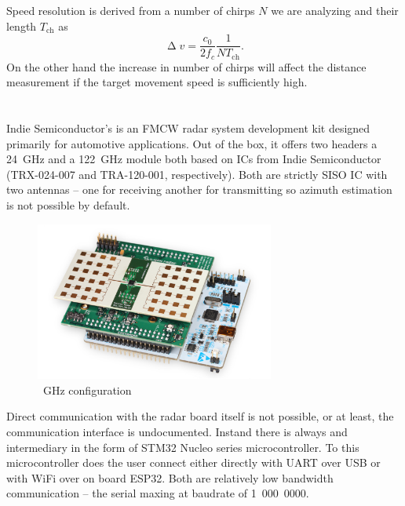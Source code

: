 Speed resolution is derived from a number of chirps $N$ we are analyzing and their length $T_{\mathrm{ch}}$ as
\begin{equation}
	\upDelta v = \frac{c_0}{2f_c} \frac{1}{NT_{\mathrm{ch}}}.
	\label{eq:doppler3}
\end{equation}
On the other hand the increase in number of chirps will affect the distance measurement if the target movement speed is sufficiently high.



\chapter{\sidar}

Indie Semiconductor's \sidar is an FMCW radar system development kit designed primarily for automotive applications.
Out of the box, it offers two headers a 24~GHz and a 122~GHz module both based on ICs from Indie Semiconductor (TRX-024-007 and TRA-120-001, respectively).
Both are strictly SISO IC with two antennas -- one for receiving another for transmitting so azimuth estimation is not possible by default.

\begin{figure}[h!]
	\centering
	\includegraphics[width=0.7\textwidth]{../img/sidar.png}

	\caption[\sidar \cite{sidarMANOld}]{~GHz configuration}
	\label{fig:sidar}
\end{figure}

Direct communication with the radar board itself is not possible, or at least, the communication interface is undocumented.
Instand there is always and intermediary in the form of  STM32 Nucleo series microcontroller.
To this microcontroller does the user connect either directly with UART over USB or with WiFi over on board ESP32.
Both are relatively low bandwidth communication -- the serial maxing at baudrate of 1~000~0000.

